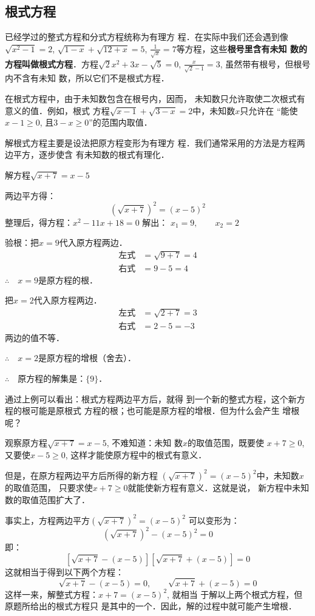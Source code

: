 \subsection{根式方程}
已经学过的整式方程和分式方程统称为有理方
程．在实际中我们还会遇到像$\sqrt{x^2-1}=2$, $\sqrt{1-x}+\sqrt{12+x}=5$,
$\frac{1}{\sqrt{x}}=7$等方程，这些\textbf{根号里含有未知
数的方程叫做根式方程}．方程$\sqrt{2}x^2+3x-\sqrt{5}=0$, 
$\frac{x}{\sqrt{2}-1}=3$, 虽然带有根号，但根号内不含有未知
数，所以它们不是根式方程．

在根式方程中，由于未知数包含在根号内，因而，
未知数只允许取使二次根式有意义的值．例如，根式
方程$\sqrt{x-1}+\sqrt{3-x}=2$中，未知数$x$只允许在
“能使$x-1\ge 0$, 且$3-x\ge 0$”的范围内取值．

解根式方程主要是设法把原方程变形为有理方
程．我们通常采用的方法是方程两边平方，逐步使含
有未知数的根式有理化．





\begin{example}
解方程$\sqrt{x+7}=x-5$
\end{example}

\begin{solution}
    两边平方得：
    \[(\sqrt{x+7})^2=(x-5)^2\]
    整理后，得方程：$x^2-11x+18=0$
    解出：
    $x_1=9,\qquad x_2=2$

    验根：把$x=9$代入原方程两边．
    \[\begin{split}
        \text{左式}&=\sqrt{9+7}=4\\
        \text{右式}&=9-5=4      
    \end{split}\]
$\therefore\quad x=9$是原方程的根．
    
把$x=2$代入原方程两边．
\[\begin{split}
    \text{左式}&=\sqrt{2+7}=3\\
    \text{右式}&=2-5=-3      
\end{split}\]
两边的值不等．

$\therefore\quad x=2$是原方程的增根（舍去）．

$\therefore\quad $原方程的解集是：$\{9\}$．

通过上例可以看出：根式方程两边平方后，就得
到一个新的整式方程，这个新方程的根可能是原根式
方程的根；也可能是原方程的增根．但为什么会产生
增根呢？

观察原方程$\sqrt{x+7}=x-5$, 不难知道：未知
数$x$的取值范围，既要使
$x+7\ge 0$, 又要使$x-5
\ge 0$, 这样才能使原方程中的根式有意义．

但是，在原方程两边平方后所得的新方程
$(\sqrt{x+7})^2=(x-5)^2$中，未知数$x$的取值范围，
只要求使$x+7\ge 0$就能使新方程有意义．这就是说，
新方程中未知数的取值范围扩大了．

事实上，方程两边平方$(\sqrt{x+7})^2=(x-5)^2$
可以变形为：
\[(\sqrt{x+7})^2-(x-5)^2=0\]
即：
\[\left[\sqrt{x+7}-(x-5)\right]\left[\sqrt{x+7}+(x-5)\right]=0 \]
这就相当于得到以下两个方程：
\[\sqrt{x+7}-(x-5)=0,\qquad \sqrt{x+7}+(x-5)=0\]
这样一来，解整式方程：$x+7=(x-5)^2$, 就相当
于解以上两个根式方程，但原题所给出的根式方程只
是其中的一个．因此，解的过程中就可能产生增根．
\end{solution}


